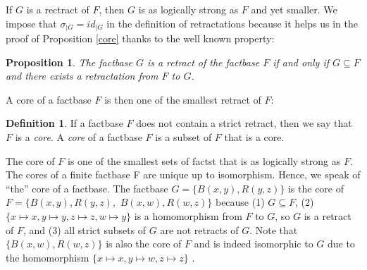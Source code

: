 \documentclass{article}
\newtheorem{proposition}{Proposition}[section]
\theoremstyle{definition}
\newtheorem{definition}{Definition}[section]
\theoremstyle{remark}
\begin{document}
If $G$ is a rectract of $F$, then $G$ is as logically strong as $F$ and yet smaller. We impose that $\sigma_{|G}=id_{|G}$ in the definition of retractations because it helps us in the proof of Proposition \ref{core} thanks to the well known property:


\begin{proposition} \label{retract}
The factbase $G$ is a retract of the factbase $F$ if and only if $G \subseteq F$  and there exists a retractation from $F$ to $G$.
\end{proposition}

A core of a factbase $F$ is then one of the smallest retract of $F$:

\begin{definition}
If a factbase $F$ does not contain a strict retract, then we say that $F$ is a \emph{core}. A \emph{core} of a factbase $F$ is a subset of $F$ that is a core.
\end{definition}

The core of $F$ is one of the smallest sets of factst that is as logically strong as $F$. The cores of a finite factbase F are unique up to isomorphism. Hence, we speak of ``the'' core of a factbase. The factbase $G = \{B(x,y),R(y,z)\}$ is the core of $F = \{B(x,y),R(y,z),$ $B(x,w),R(w,z)\}$ because (1) $G \subseteq F$, (2)
$\{x \mapsto x, y \mapsto y, z \mapsto z, w \mapsto y\}$ is a homomorphism from $F$ to $G$, so $G$ is a retract of $F$, and (3) all strict subsets of $G$ are not retracts of $G$. Note that $ \{B(x,w),R(w,z)\}$ is also the core of $F$ and is indeed isomorphic to $G$ due to the homomorphism $\{x \mapsto x, y \mapsto w, z \mapsto z\}$ .



\end{document}
